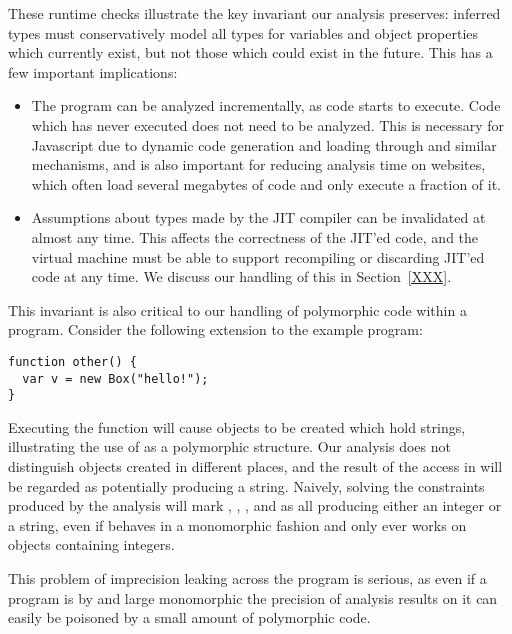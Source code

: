 These runtime checks illustrate the key invariant our analysis
preserves: inferred types must conservatively model all types for
variables and object properties which currently exist, but not those
which could exist in the future.
This has a few important implications:

\begin{itemize}

\item The program can be analyzed incrementally, as code starts to execute.
Code which has never executed does not need to be analyzed.
This is necessary for Javascript due to dynamic code generation
and loading through
 and similar mechanisms, and is also important for reducing
analysis time on websites, which often load several megabytes of
code and only execute a fraction of it.

\item Assumptions about types made by the JIT compiler can be invalidated
at almost any time.
This affects the correctness of the JIT'ed code, and the virtual machine
must be able to support recompiling or discarding JIT'ed code at any time.
We discuss our handling of this in Section~\ref{XXX}.

\end{itemize}

This invariant is also critical to our handling of polymorphic code
within a program.
Consider the following extension to the example program:

\begin{lstlisting}
function other() {
  var v = new Box("hello!");
}
\end{lstlisting}

Executing the  function will cause  objects
to be created which hold strings,
illustrating the use of  as a polymorphic structure.
Our analysis does not distinguish  objects created in different
places, and the result of the  access in  will
be regarded as potentially producing a string.
Naively, solving the constraints produced by the analysis will mark
, , , and  as all producing
either an integer or a string, even if  behaves in a monomorphic
fashion and only ever works on  objects containing integers.

This problem of imprecision leaking across the program is serious, as even
if a program is by and large monomorphic the precision of analysis results on
it can easily be poisoned by a small amount of polymorphic code.

